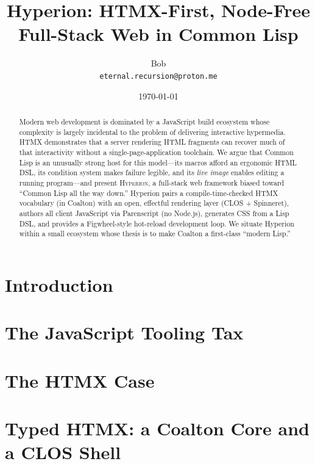 \documentclass[11pt,a4paper]{article}
\title{\textbf{Hyperion}: HTMX-First, Node-Free\\ Full-Stack Web in Common Lisp}
\author{Bob\\ \small\texttt{eternal.recursion@proton.me}}
\date{\today}
\begin{document}
\maketitle

\begin{abstract}
Modern web development is dominated by a JavaScript build ecosystem whose
complexity is largely incidental to the problem of delivering interactive
hypermedia. \textsc{HTMX} demonstrates that a server rendering HTML fragments can
recover much of that interactivity without a single-page-application toolchain.
We argue that Common Lisp is an unusually strong host for this model---its macros
afford an ergonomic HTML DSL, its condition system makes failure legible, and its
\emph{live image} enables editing a running program---and present \textsc{Hyperion},
a full-stack web framework biased toward ``Common Lisp all the way down.''
Hyperion pairs a compile-time-checked HTMX vocabulary (in Coalton) with an open,
effectful rendering layer (CLOS + Spinneret), authors all client JavaScript via
Parenscript (no Node.js), generates CSS from a Lisp DSL, and provides a
Figwheel-style hot-reload development loop. We situate Hyperion within a small
ecosystem whose thesis is to make Coalton a first-class ``modern Lisp.''
\end{abstract}

\section{Introduction}
\label{sec:intro}

\section{The JavaScript Tooling Tax}
\label{sec:tax}

\section{The HTMX Case}
\label{sec:htmx}

\section{Typed HTMX: a Coalton Core and a CLOS Shell}
\label{sec:typed}
\end{document}

